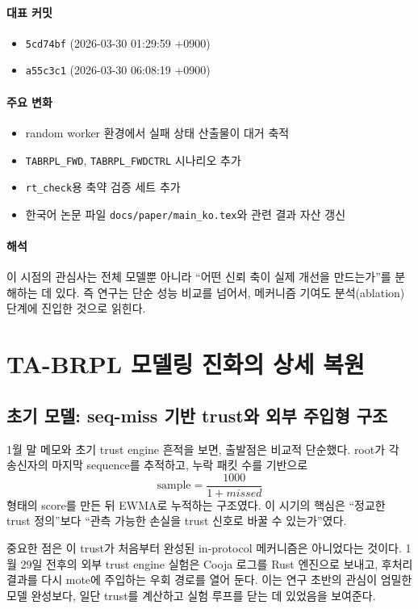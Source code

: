 \documentclass[12pt,a4paper]{article}
\begin{document}
\paragraph{대표 커밋}
\begin{itemize}[leftmargin=1.5em]
\item \texttt{5cd74bf} (2026-03-30 01:29:59 +0900)
\item \texttt{a55c3c1} (2026-03-30 06:08:19 +0900)
\end{itemize}

\paragraph{주요 변화}
\begin{itemize}[leftmargin=1.5em]
\item random worker 환경에서 실패 상태 산출물이 대거 축적
\item \texttt{TABRPL\_FWD}, \texttt{TABRPL\_FWDCTRL} 시나리오 추가
\item \texttt{rt\_check}용 축약 검증 세트 추가
\item 한국어 논문 파일 \texttt{docs/paper/main\_ko.tex}와 관련 결과 자산 갱신
\end{itemize}

\paragraph{해석}
이 시점의 관심사는 전체 모델뿐 아니라 ``어떤 신뢰 축이 실제 개선을 만드는가''를
분해하는 데 있다. 즉 연구는 단순 성능 비교를 넘어서,
메커니즘 기여도 분석(ablation) 단계에 진입한 것으로 읽힌다.

\section{TA-BRPL 모델링 진화의 상세 복원}

\subsection{초기 모델: seq-miss 기반 trust와 외부 주입형 구조}

1월 말 메모와 초기 trust engine 흔적을 보면, 출발점은 비교적 단순했다.
root가 각 송신자의 마지막 sequence를 추적하고, 누락 패킷 수를 기반으로
\[
\text{sample} = \frac{1000}{1 + missed}
\]
형태의 score를 만든 뒤 EWMA로 누적하는 구조였다. 이 시기의 핵심은
``정교한 trust 정의''보다 ``관측 가능한 손실을 trust 신호로 바꿀 수 있는가''였다.

중요한 점은 이 trust가 처음부터 완성된 in-protocol 메커니즘은 아니었다는 것이다.
1월 29일 전후의 외부 trust engine 실험은 Cooja 로그를 Rust 엔진으로 보내고,
후처리 결과를 다시 mote에 주입하는 우회 경로를 열어 둔다. 이는 연구 초반의 관심이
엄밀한 모델 완성보다, 일단 trust를 계산하고 실험 루프를 닫는 데 있었음을 보여준다.
\end{document}

